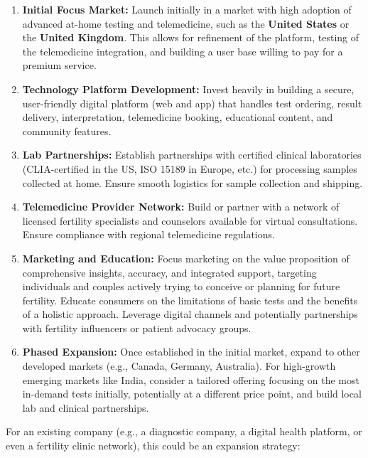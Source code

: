\documentclass{article}
\begin{document}
\begin{enumerate}
    \item \textbf{Initial Focus Market:} Launch initially in a market with high adoption of advanced at-home testing and telemedicine, such as the \textbf{United States} or the \textbf{United Kingdom}. This allows for refinement of the platform, testing of the telemedicine integration, and building a user base willing to pay for a premium service.
    \item \textbf{Technology Platform Development:} Invest heavily in building a secure, user-friendly digital platform (web and app) that handles test ordering, result delivery, interpretation, telemedicine booking, educational content, and community features.
    \item \textbf{Lab Partnerships:} Establish partnerships with certified clinical laboratories (CLIA-certified in the US, ISO 15189 in Europe, etc.) for processing samples collected at home. Ensure smooth logistics for sample collection and shipping.
    \item \textbf{Telemedicine Provider Network:} Build or partner with a network of licensed fertility specialists and counselors available for virtual consultations. Ensure compliance with regional telemedicine regulations.
    \item \textbf{Marketing and Education:} Focus marketing on the value proposition of comprehensive insights, accuracy, and integrated support, targeting individuals and couples actively trying to conceive or planning for future fertility. Educate consumers on the limitations of basic tests and the benefits of a holistic approach. Leverage digital channels and potentially partnerships with fertility influencers or patient advocacy groups.
    \item \textbf{Phased Expansion:} Once established in the initial market, expand to other developed markets (e.g., Canada, Germany, Australia). For high-growth emerging markets like India, consider a tailored offering focusing on the most in-demand tests initially, potentially at a different price point, and build local lab and clinical partnerships.
\end{enumerate}

For an existing company (e.g., a diagnostic company, a digital health platform, or even a fertility clinic network), this could be an expansion strategy:
\end{document}
